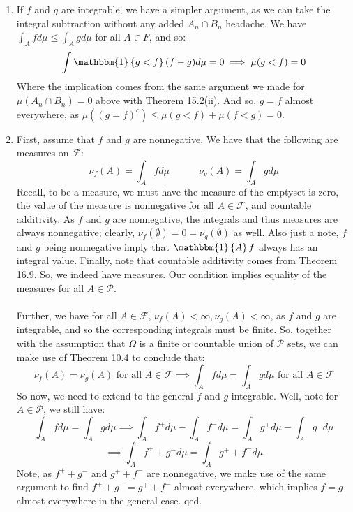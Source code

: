 \documentclass[12pt,a4paper]{article}
\newcommand{\1}[1]{\mathbbm{1}\left\{ #1 \right\}}
\newcommand{\fcal}{\mathcal{F}}
\newcommand{\pcal}{\mathcal{P}}
\begin{document}
\begin{enumerate}
	\item If $f$ and $g$ are integrable, we have a simpler argument, as we can take the integral subtraction without any added $A_n \cap B_n$ headache. We have $\int_A f d\mu \leq \int_A g d\mu$ for all $A \in F$, and so:
	$$
		\int \1{g < f} (f - g) d\mu = 0 \implies \mu(g < f) = 0
	$$
	Where the implication comes from the same argument we made for $\mu(A_n \cap B_n) = 0$ above with Theorem 15.2(ii). And so, $g = f$ almost everywhere, as $\mu((g = f)^c) \leq \mu(g < f) + \mu(f < g) = 0$.
	
	\item First, assume that $f$ and $g$ are nonnegative. We have that the following are measures on $\fcal$:
	$$
		\nu_f(A) = \int_A f d\mu \quad\quad\quad
		\nu_g(A) = \int_A g d\mu
	$$
	Recall, to be a measure, we must have the measure of the emptyset is zero, the value of the measure is nonnegative for all $A \in \fcal$, and countable additivity. As $f$ and $g$ are nonnegative, the integrals and thus measures are always nonnegative; clearly, $\nu_f(\emptyset) = 0 = \nu_g(\emptyset)$ as well. Also just a note, $f$ and $g$ being nonnegative imply that $\1{A}f$ always has an integral value. Finally, note that countable additivity comes from Theorem 16.9. So, we indeed have measures. Our condition implies equality of the measures for all $A \in \pcal$.
	\\\\
	Further, we have for all $A \in \fcal$, $\nu_f(A) < \infty, \nu_g(A) < \infty$, as $f$ and $g$ are integrable, and so the corresponding integrals must be finite. So, together with the assumption that $\Omega$ is a finite or countable union of $\pcal$ sets, we can make use of Theorem 10.4 to conclude that:
	$$
		\nu_f(A) = \nu_g(A) \text{ for all $A \in \fcal$} \implies
		\int_A f d\mu = \int_A g d\mu \text{ for all $A \in \fcal$}
	$$
	So now, we need to extend to the general $f$ and $g$ integrable. Well, note for $A \in \pcal$, we still have:
	$$
		\int_A f d\mu = \int_A g d\mu \implies
		\int_A f^+ d\mu - \int_A f^- d\mu = \int_A g^+ d\mu - \int_A g^- d\mu
	$$
	$$
		\implies
		\int_A f^+ + g^- d\mu = \int_A g^+ + f^- d\mu
	$$
	Note, as $f^+ + g^-$ and $g^+ + f^-$ are nonnegative, we make use of the same argument to find $f^+ + g^- = g^+ + f^-$ almost everywhere, which implies $f = g$ almost everywhere in the general case. qed.
	
\end{enumerate}
\end{document}
